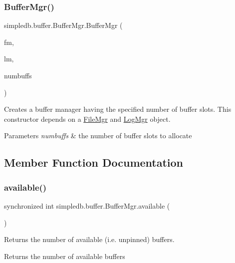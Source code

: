 \subsubsection{\texorpdfstring{Buffer\+Mgr()}{BufferMgr()}}
{\footnotesize\ttfamily simpledb.\+buffer.\+Buffer\+Mgr.\+Buffer\+Mgr (\begin{DoxyParamCaption}\item[{\hyperlink{classsimpledb_1_1file_1_1FileMgr}{File\+Mgr}}]{fm,  }\item[{\hyperlink{classsimpledb_1_1log_1_1LogMgr}{Log\+Mgr}}]{lm,  }\item[{int}]{numbuffs }\end{DoxyParamCaption})\hspace{0.3cm}{\ttfamily [inline]}}

Creates a buffer manager having the specified number of buffer slots. This constructor depends on a \hyperlink{}{File\+Mgr} and \hyperlink{classsimpledb_1_1log_1_1LogMgr}{Log\+Mgr} object. 
\begin{DoxyParams}{Parameters}
{\em numbuffs} & the number of buffer slots to allocate \\
\hline
\end{DoxyParams}


\subsection{Member Function Documentation}
\mbox{\label{classsimpledb_1_1buffer_1_1BufferMgr_a39e0c2c3184bbf6c15e3c7b2bd4151e0}} 
\subsubsection{\texorpdfstring{available()}{available()}}
{\footnotesize\ttfamily synchronized int simpledb.\+buffer.\+Buffer\+Mgr.\+available (\begin{DoxyParamCaption}{ }\end{DoxyParamCaption})\hspace{0.3cm}{\ttfamily [inline]}}

Returns the number of available (i.\+e. unpinned) buffers. \begin{DoxyReturn}{Returns}
the number of available buffers 
\end{DoxyReturn}
\mbox{\label{classsimpledb_1_1buffer_1_1BufferMgr_a0f77a2fcb04ff531bf44afb40860f10f}} 
